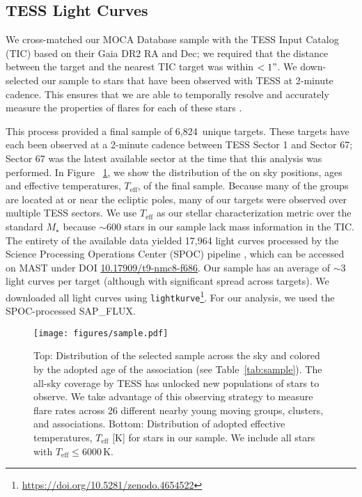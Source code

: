 \documentclass[twocolumn]{aastex631}
\newcommand{\nstars}{6,824}
\begin{document}
\subsection{TESS Light Curves}\label{subsec2:TESS_lightcurve}

We cross-matched our MOCA Database sample with the TESS Input Catalog (TIC) based
on their Gaia DR2 RA and Dec; we required that the distance between the target and
the nearest TIC target was within $<1"$. We down-selected our sample to stars that
have been observed with TESS at 2-minute cadence. This ensures that we are able to
temporally resolve and accurately measure the properties of flares for each of these
stars \citep{howard22}.

This process provided a final sample of \nstars\ unique targets. These targets
have each been observed at a 2-minute cadence between TESS Sector 1 and Sector 67;
Sector 67 was the latest available sector at the time that this analysis was performed.
In Figure ~\ref{fig:sample}, we show the distribution of the on sky positions, ages
and effective temperatures, $T_\textrm{eff}$, of the final sample. Because many of
the groups are located at or near the ecliptic poles, many of our targets were observed
over multiple TESS sectors. We use $T_\textrm{eff}$ as our stellar characterization
metric over the standard $M_\star$ because $\sim 600$ stars in our sample lack mass
information in the TIC. The entirety of the available data yielded 17,964 light curves
processed by the Science Processing Operations Center (SPOC) pipeline \citep{jenkins16},
which can be accessed on MAST under DOI  \href{http://dx.doi.org/10.17909/t9-nmc8-f686}{10.17909/t9-nmc8-f686}.
Our sample has an average of $\sim 3$ light curves per target (although with significant
spread across targets). We downloaded all light curves using \texttt{lightkurve}\footnote{\url{https://doi.org/10.5281/zenodo.4654522}}.
For our analysis, we used the SPOC-processed SAP\_FLUX.

\begin{figure}[ht!]
    \begin{centering}
        \texttt{[image: figures/sample.pdf]}
        \caption{
            Top: Distribution of the selected sample across the sky and colored by the adopted age of the association (see Table~\ref{tab:sample}). The all-sky coverage by TESS
            has unlocked new populations of stars to observe. We take advantage of this observing strategy to measure flare rates across 26 different nearby young moving groups,
            clusters, and associations. Bottom: Distribution of adopted effective temperatures, $T_\textrm{eff}$ [K] for stars in our sample. We include all stars with $T_\textrm{eff} \leq 6000$\,K.
        }
        \label{fig:sample}
    \end{centering}
\end{figure}
\end{document}
